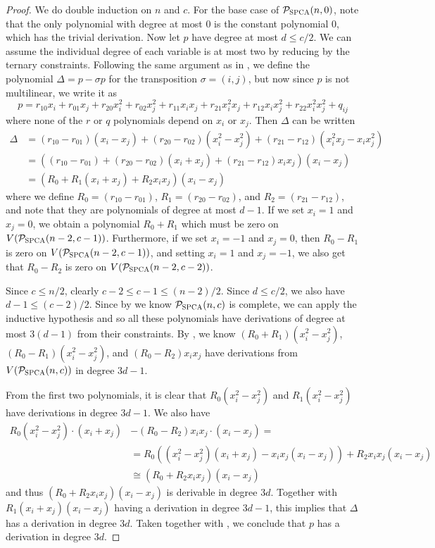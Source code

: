 \begin{proof}
We do double induction on $n$ and $c$. For the base case of $\mathcal P_{\textsc{SPCA}}(n,0)$, note that the only polynomial with degree at most $0$ is the constant polynomial $0$, which has the trivial derivation. Now let $p$ have degree at most $d \leq c/2$. We can assume the individual degree of each variable is at most two by reducing by the ternary constraints. Following the same argument as in , we define the polynomial $\Delta = p - \sigma p$ for the transposition $\sigma = (i,j)$, but now since $p$ is not multilinear, we write it as 
\[p = r_{10}x_i + r_{01}x_j + r_{20}x_i^2 + r_{02}x_j^2 + r_{11}x_ix_j + r_{21}x_i^2x_j + r_{12}x_ix_j^2 + r_{22}x_i^2x_j^2 + q_{ij}\]
where none of the $r$ or $q$ polynomials depend on $x_i$ or $x_j$. Then $\Delta$ can be written
\begin{align*}
\Delta &= (r_{10} - r_{01})(x_i - x_j) + (r_{20} - r_{02})(x_i^2 - x_j^2) + (r_{21} - r_{12})(x_i^2x_j - x_ix_j^2) \\
&= ((r_{10} - r_{01}) + (r_{20} - r_{02})(x_i+x_j) + (r_{21} - r_{12})x_ix_j)(x_i - x_j) \\
&= (R_0 + R_1(x_i + x_j) + R_2x_ix_j)(x_i - x_j)
\end{align*}
where we define $R_0 = (r_{10} - r_{01})$, $R_1 = (r_{20} - r_{02})$, and $R_2 = (r_{21} - r_{12})$, and note that they are polynomials of degree at most $d-1$. If we set $x_i = 1$ and $x_j = 0$, we obtain a polynomial $R_0 + R_1$ which must be zero on $V(\mathcal P_{\textsc{SPCA}}(n-2,c-1))$. Furthermore, if we set $x_i = -1$ and $x_j = 0$, then $R_0 - R_1$ is zero on $V(\mathcal P_{\textsc{SPCA}}(n-2,c-1))$, and setting $x_i = 1$ and $x_j = -1$, we also get that $R_0 - R_2$ is zero on $V(\mathcal P_{\textsc{SPCA}}(n-2,c-2))$. 

Since $c \leq n/2$, clearly $c-2 \leq c-1 \leq (n-2)/2$. Since $d \leq c/2$, we also have $d-1 \leq (c-2)/2$. Since by  we know $\mathcal P_{\textsc{SPCA}}(n,c)$ is complete, we can apply the inductive hypothesis and so all these polynomials have derivations of degree at most $3(d-1)$ from their constraints. By , we know $(R_0+R_1)(x_i^2-x_j^2)$, $(R_0 - R_1)(x_i^2-x_j^2)$, and $(R_0 - R_2)x_ix_j$ have derivations from $V(\mathcal P_{\textsc{SPCA}}(n,c))$ in degree $3d-1$.

From the first two polynomials, it is clear that $R_0(x_i^2-x_j^2)$ and $R_1(x_i^2-x_j^2)$ have derivations in degree $3d-1$. We also have
\begin{align*}
R_0(x_i^2-x_j^2) \cdot (x_i+x_j) &- (R_0 - R_2)x_ix_j \cdot (x_i - x_j) = \\&= R_0((x_i^2 - x_j^2)(x_i+x_j) - x_ix_j(x_i - x_j)) + R_2x_ix_j(x_i - x_j) \\
&\cong (R_0 + R_2x_ix_j)(x_i - x_j)
\end{align*}
and thus $(R_0 + R_2x_ix_j)(x_i - x_j)$ is derivable in degree $3d$. Together with $R_1(x_i + x_j)(x_i - x_j)$ having a derivation in degree $3d-1$, this implies that $\Delta$ has a derivation in degree $3d$. Taken together with , we conclude that $p$ has a derivation in degree $3d$. 
\end{proof}

